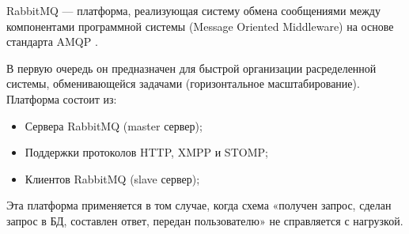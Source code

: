RabbitMQ --- платформа, реализующая систему обмена сообщениями между компонентами программной системы (Message Oriented Middleware) на основе стандарта AMQP \cite{rabbit_wiki}. 


В первую очередь он предназначен для быстрой организации расределенной системы, обменивающейся задачами (горизонтальное масштабирование). Платформа состоит из:

\begin{itemize}
\item Сервера RabbitMQ (master сервер);
\item Поддержки протоколов HTTP, XMPP и STOMP;
\item Клиентов RabbitMQ (slave сервер);
\end{itemize}

Эта платформа применяется в том случае, когда схема «получен запрос, сделан запрос в БД, составлен ответ, передан пользователю» не справляется с нагрузкой.
